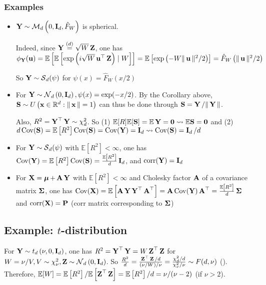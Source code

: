 \subsubsection*{Examples}
\begin{itemize}[leftmargin=*]
    \item $\Y \sim \M_{d}\left(0, \I_{d}, \hat{F}_{W}\right)$ is spherical. 
    
    Indeed, since $\Y \stackrel{(d)}{=} \sqrt{W} \Z$, one has
$
\phi_{\Y}(\u)=\mathbb{E}\left[\mathbb{E}\left[\exp \left(i \sqrt{W} \u^{\T} \Z\right) \mid W\right]\right]=\mathbb{E}\left[\exp \left(-W\|\u\|^{2} / 2\right)\right]=\hat{F}_{W}\left(\|\u\|^{2} / 2\right)
$

So $\Y \sim \S_{d}(\psi)$ for $\psi(x)=\hat{F}_{W}(x / 2)$
    \item For $\Y \sim \N_{d}\left(0, \I_{d}\right), \psi(x)=\exp (-x / 2)$. By the Corollary above,  $\vect{S} \sim U\left(\x \in \mathbb{R}^{d}:\|\x\|=1\right)$ can thus be done through $\vect{S}=\Y /\|\Y\|$.
    
    Also, $R^{2}=\Y^{\T} \Y \sim \chi_{d}^{2}$. So (1) $\mathbb{E}[R] \mathbb{E}[\vect{S}]=\mathbb{E} \Y=\vect{0} \rightsquigarrow \mathbb{E} \vect{S}=\vect{0}$ and (2) $d \operatorname{Cov}(\vect{S})=\mathbb{E}\left[R^{2}\right] \operatorname{Cov}(\vect{S})=\operatorname{Cov}(\Y)=\I_{d} \rightsquigarrow \operatorname{Cov}(\vect{S})=\I_{d} / d$
    
    \item For $\Y \sim \S_{d}(\psi)$ with $\mathbb{E}\left[R^{2}\right]<\infty$, one has
$
\operatorname{Cov}(\Y)=\mathbb{E}\left[R^{2}\right] \operatorname{Cov}(\vect{S})=\frac{\mathbb{E}\left[R^{2}\right]}{d} \I_{d}
$, and $\operatorname{corr}(\Y)=\I_{d}$

    \item For $\X=\mmu+\A \Y$ with $\mathbb{E}\left[R^{2}\right]<\infty$ and Cholesky factor $\A$ of a covariance matrix $\mSigma$, one has
$
\operatorname{Cov}(\X)=\mathbb{E}\left[\A \Y \Y^{\T} \A^{\T}\right]=\A \operatorname{Cov}(\Y) \A^{\T}=\frac{\mathbb{E}\left[R^{2}\right]}{d} \mSigma
$ and $\operatorname{corr}(\X)=\vect{P}$ (corr matrix corresponding to $\mSigma$)
\end{itemize}




\subsection*{Example: $t$-distribution}
For $\Y \sim t_{d}\left(\nu, 0, \I_{d}\right)$, one has $R^{2}=\Y^{\T} \Y=W \Z^{\T} \Z$ for $ W=\nu / V, V \sim \chi_{\nu}^{2}, \Z \sim \N_{d}\left(0, \I_{d}\right) $. 
So
$
\frac{R^{2}}{d}=\frac{\Z^{\T} \Z / d}{(\nu / W) / \nu}=\frac{\chi_{d}^{2} / d}{\chi_{\nu}^{2} / \nu} \sim F(d, \nu)
$ ().
Therefore, $\mathbb{E}[W]=\mathbb{E}\left[R^{2}\right] / \mathbb{E}\left[\Z^{\T} \Z\right]=\mathbb{E}\left[R^{2}\right] / d=\nu /(\nu-2)$ (if $\nu>2$).

